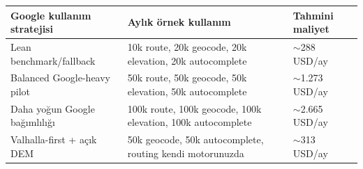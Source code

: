 \documentclass[varwidth=18cm, border=1cm]{standalone}
\begin{document}
\vspace{0.5cm}

\begin{table}[h]
\centering
\renewcommand{\arraystretch}{1.3}
\begin{tabularx}{\textwidth}{@{} >{\raggedright\arraybackslash}p{4cm} X >{\raggedleft\arraybackslash}p{3cm} @{}}
\toprule
\textbf{Google kullanım stratejisi} & \textbf{Aylık örnek kullanım} & \textbf{Tahmini maliyet} \\
\midrule
Lean benchmark/fallback & 10k route, 20k geocode, 20k elevation, 20k autocomplete & $\sim$288 USD/ay \\
Balanced Google-heavy pilot & 50k route, 50k geocode, 50k elevation, 50k autocomplete & $\sim$1.273 USD/ay \\
Daha yoğun Google bağımlılığı & 100k route, 100k geocode, 100k elevation, 100k autocomplete & $\sim$2.665 USD/ay \\
Valhalla-first + açık DEM & 50k geocode, 50k autocomplete, routing kendi motorunuzda & $\sim$313 USD/ay \\
\bottomrule
\end{tabularx}
\end{table}

\vspace{0.5cm}
\end{document}
